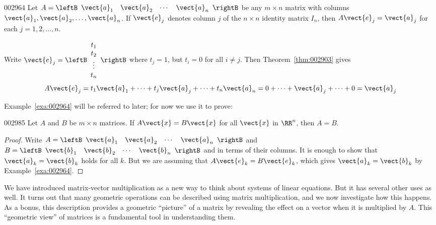 \begin{example}{}{002964}
Let $A = \leftB \begin{array}{cccc}
\vect{a}_{1} & \vect{a}_{2} & \cdots & \vect{a}_{n}
\end{array} \rightB$ be any $m \times n$ matrix with columns $\vect{a}_{1}, \vect{a}_{2}, \dots, \vect{a}_{n}$. If $\vect{e}_{j}$ denotes column $j$ of the $n \times n$ identity matrix $I_{n}$, then $A\vect{e}_{j} = \vect{a}_{j}$ for each $j = 1, 2, \dots, n$.


\begin{solution}
  Write $\vect{e}_{j} = \leftB \begin{array}{c}
  t_{1} \\
  t_{2} \\
  \vdots \\
  t_{n}
  \end{array} \rightB$
 where $t_{j} = 1$, but $t_{i} = 0$ for all $i \neq j$. Then Theorem~\ref{thm:002903} gives
\begin{equation*}
A\vect{e}_{j} = t_{1}\vect{a}_{1} + \dots + t_{j}\vect{a}_{j} + \dots + t_{n}\vect{a}_{n} = 0 + \dots + \vect{a}_{j} + \dots + 0 = \vect{a}_{j}
\end{equation*}
\end{solution}
\end{example}

Example~\ref{exa:002964} will be referred to later; for now we use it to prove:


\begin{theorem}{}{002985}
Let $A$ and $B$ be $m \times n$ matrices. If $A\vect{x} = B\vect{x}$ for all $\vect{x}$ in $\RR^n$, then $A = B$.
\end{theorem}

\begin{proof}
Write $A = \leftB \begin{array}{cccc}
\vect{a}_{1} & \vect{a}_{2} & \cdots & \vect{a}_{n}
\end{array} \rightB$ and $B = \leftB \begin{array}{cccc}
\vect{b}_{1} & \vect{b}_{2} & \cdots & \vect{b}_{n}
\end{array} \rightB$ and in terms of their columns. It is enough to show that $\vect{a}_{k} = \vect{b}_{k}$ holds for all $k$. But we are assuming that $A\vect{e}_{k} = B\vect{e}_{k}$, which gives $\vect{a}_{k} = \vect{b}_{k}$ by Example~\ref{exa:002964}.
\end{proof}

We have introduced matrix-vector multiplication as a new way to think about systems of linear equations. But it has several other uses as well. It turns out that many geometric operations can be described using matrix multiplication, and we now investigate how this happens. As a bonus, this description provides a geometric ``picture'' of a matrix by revealing the effect on a vector when it is multiplied by $A$. This ``geometric view'' of matrices is a fundamental tool in understanding them.


